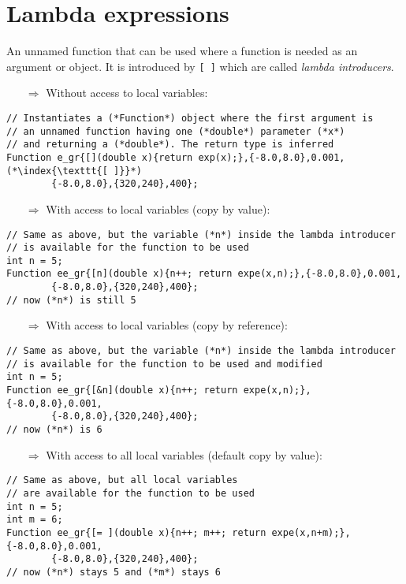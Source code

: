 \documentclass[10pt]{article}
\begin{document}
\section{Lambda expressions}
\small
An unnamed function that can be used where a function is needed as an argument or object.
It is introduced by \texttt{[ ]} which are called \emph{lambda introducers}.
\begin{enumerate}
\item[$\Rightarrow$] Without access to local variables:
\end{enumerate}
\begin{lstlisting}
// Instantiates a (*Function*) object where the first argument is
// an unnamed function having one (*double*) parameter (*x*)
// and returning a (*double*). The return type is inferred
Function e_gr{[](double x){return exp(x);},{-8.0,8.0},0.001,(*\index{\texttt{[ ]}}*)
        {-8.0,8.0},{320,240},400};
\end{lstlisting}
\begin{enumerate}
\item[$\Rightarrow$] With access to local variables (copy by value):
\end{enumerate}
\begin{lstlisting}
// Same as above, but the variable (*n*) inside the lambda introducer
// is available for the function to be used
int n = 5;
Function ee_gr{[n](double x){n++; return expe(x,n);},{-8.0,8.0},0.001,
        {-8.0,8.0},{320,240},400};
// now (*n*) is still 5
\end{lstlisting}
\begin{enumerate}
\item[$\Rightarrow$] With access to local variables (copy by reference):
\end{enumerate}
\begin{lstlisting}
// Same as above, but the variable (*n*) inside the lambda introducer
// is available for the function to be used and modified
int n = 5;
Function ee_gr{[&n](double x){n++; return expe(x,n);},{-8.0,8.0},0.001,
        {-8.0,8.0},{320,240},400};
// now (*n*) is 6
\end{lstlisting}
\begin{enumerate}
\item[$\Rightarrow$] With access to all local variables (default copy by value):
\end{enumerate}
\begin{lstlisting}
// Same as above, but all local variables
// are available for the function to be used
int n = 5;
int m = 6;
Function ee_gr{[= ](double x){n++; m++; return expe(x,n+m);},{-8.0,8.0},0.001,
        {-8.0,8.0},{320,240},400};
// now (*n*) stays 5 and (*m*) stays 6 
 \end{lstlisting}
\end{document}
